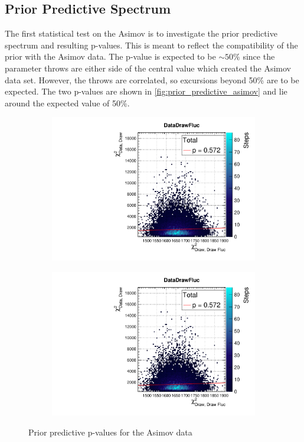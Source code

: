 \subsection{Prior Predictive Spectrum}
\label{sec:Asimov_prior}
The first statistical test on the Asimov is to investigate the prior predictive spectrum and resulting p-values. This is meant to reflect the compatibility of the prior with the Asimov data. The p-value is expected to be $\sim50\%$ since the parameter throws are either side of the central value which created the Asimov data set. However, the throws are correlated, so excursions beyond 50\% are to be expected. The two p-values are shown in \autoref{fig:prior_predictive_asimov} and lie around the expected value of 50\%.
\begin{figure}[h]
	\begin{subfigure}[t]{0.49\textwidth}
		\includegraphics[width=\textwidth, trim={0mm 0mm 0mm 11mm}, clip,page=1]{figures/mach3/Asimov/2017b_NewDet_3Xsec_4Det_5Flux_NewXSecTune_Asimov_merge_PriorPred_procs}
	\end{subfigure}
	\begin{subfigure}[t]{0.49\textwidth}
		\includegraphics[width=\textwidth, trim={0mm 0mm 0mm 11mm}, clip,page=2]{figures/mach3/Asimov/2017b_NewDet_3Xsec_4Det_5Flux_NewXSecTune_Asimov_merge_PriorPred_procs}
	\end{subfigure}
\caption{Prior predictive p-values for the Asimov data}
\label{fig:prior_predictive_asimov}
\end{figure}

